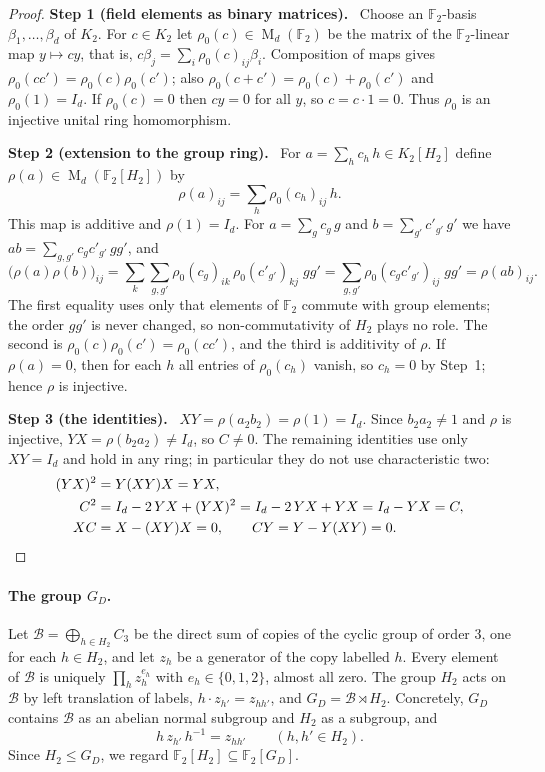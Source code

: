 \documentclass[11pt]{article}
\theoremstyle{remark}
\numberwithin{equation}{section}
\newcommand{\F}{\mathbb F}
\newcommand{\Mat}{\operatorname{M}}
\newcommand{\step}[1]{\par\smallskip\noindent\textbf{Step #1.}\ }
\begin{document}
\begin{proof}
\step{1 (field elements as binary matrices)}
Choose an $\F_2$-basis $\beta_1,\dots,\beta_d$ of $K_2$. For $c\in K_2$ let $\rho_0(c)\in\Mat_d(\F_2)$ be the matrix of the $\F_2$-linear map $y\mapsto cy$, that is, $c\beta_j=\sum_i\rho_0(c)_{ij}\beta_i$. Composition of maps gives $\rho_0(cc')=\rho_0(c)\rho_0(c')$; also $\rho_0(c+c')=\rho_0(c)+\rho_0(c')$ and $\rho_0(1)=I_d$. If $\rho_0(c)=0$ then $cy=0$ for all $y$, so $c=c\cdot1=0$. Thus $\rho_0$ is an injective unital ring homomorphism.

\step{2 (extension to the group ring)}
For $a=\sum_hc_h\,h\in K_2[H_2]$ define $\rho(a)\in\Mat_d(\F_2[H_2])$ by
\[
 \rho(a)_{ij}=\sum_{h}\rho_0(c_h)_{ij}\,h .
\]
This map is additive and $\rho(1)=I_d$. For $a=\sum_gc_g\,g$ and $b=\sum_{g'}c'_{g'}\,g'$ we have $ab=\sum_{g,g'}c_gc'_{g'}\,gg'$, and
\[
 \bigl(\rho(a)\rho(b)\bigr)_{ij}
 =\sum_{k}\sum_{g,g'}\rho_0(c_g)_{ik}\,\rho_0(c'_{g'})_{kj}\;gg'
 =\sum_{g,g'}\rho_0(c_gc'_{g'})_{ij}\;gg'
 =\rho(ab)_{ij}.
\]
The first equality uses only that elements of $\F_2$ commute with group elements; the order $gg'$ is never changed, so non-commutativity of $H_2$ plays no role. The second is $\rho_0(c)\rho_0(c')=\rho_0(cc')$, and the third is additivity of $\rho$. If $\rho(a)=0$, then for each $h$ all entries of $\rho_0(c_h)$ vanish, so $c_h=0$ by Step~1; hence $\rho$ is injective.

\step{3 (the identities)}
$XY=\rho(a_2b_2)=\rho(1)=I_d$. Since $b_2a_2\ne1$ and $\rho$ is injective, $YX=\rho(b_2a_2)\ne I_d$, so $C\ne0$. The remaining identities use only $XY=I_d$ and hold in any ring; in particular they do not use characteristic two:
\begin{align*}
 (YX)^2&=Y(XY)X=YX,\\
 C^2&=I_d-2\,YX+(YX)^2=I_d-2\,YX+YX=I_d-YX=C,\\
 XC&=X-(XY)X=0,\qquad CY=Y-Y(XY)=0. \qedhere
\end{align*}
\end{proof}

\paragraph{The group $G_D$.}
Let $\mathcal B=\bigoplus_{h\in H_2}C_3$ be the direct sum of copies of the cyclic group of order $3$, one for each $h\in H_2$, and let $z_h$ be a generator of the copy labelled $h$. Every element of $\mathcal B$ is uniquely $\prod_hz_h^{e_h}$ with $e_h\in\{0,1,2\}$, almost all zero. The group $H_2$ acts on $\mathcal B$ by left translation of labels, $h\cdot z_{h'}=z_{hh'}$, and $G_D=\mathcal B\rtimes H_2$. Concretely, $G_D$ contains $\mathcal B$ as an abelian normal subgroup and $H_2$ as a subgroup, and
\begin{equation}\label{eq:conj-rule}
 h\,z_{h'}\,h^{-1}=z_{hh'}\qquad(h,h'\in H_2).
\end{equation}
Since $H_2\le G_D$, we regard $\F_2[H_2]\subseteq\F_2[G_D]$.
\end{document}
